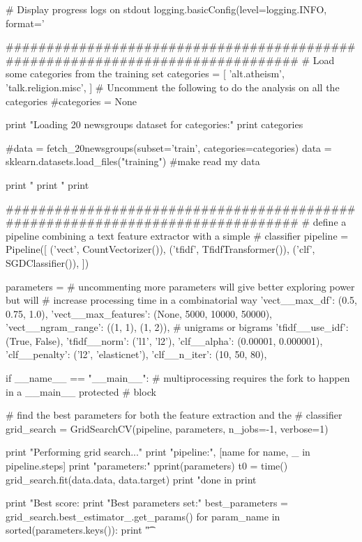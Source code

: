 \begin{pyverbatim}
# Display progress logs on stdout
logging.basicConfig(level=logging.INFO,
                    format='%


###############################################################################
# Load some categories from the training set
categories = [
    'alt.atheism',
    'talk.religion.misc',
]
# Uncomment the following to do the analysis on all the categories
#categories = None

print "Loading 20 newsgroups dataset for categories:"
print categories

#data = fetch_20newsgroups(subset='train', categories=categories)
data = sklearn.datasets.load_files("training") #make read my data

print "%
print "%
print

###############################################################################
# define a pipeline combining a text feature extractor with a simple
# classifier
pipeline = Pipeline([
    ('vect', CountVectorizer()),
    ('tfidf', TfidfTransformer()),
    ('clf', SGDClassifier()),
])

parameters = {
    # uncommenting more parameters will give better exploring power but will
    # increase processing time in a combinatorial way
    'vect__max_df': (0.5, 0.75, 1.0),
    'vect__max_features': (None, 5000, 10000, 50000),
    'vect__ngram_range': ((1, 1), (1, 2)),  # unigrams or bigrams
    'tfidf__use_idf': (True, False),
    'tfidf__norm': ('l1', 'l2'),
    'clf__alpha': (0.00001, 0.000001),
    'clf__penalty': ('l2', 'elasticnet'),
    'clf__n_iter': (10, 50, 80),
}

if __name__ == "__main__":
    # multiprocessing requires the fork to happen in a __main__ protected
    # block

    # find the best parameters for both the feature extraction and the
    # classifier
    grid_search = GridSearchCV(pipeline, parameters, n_jobs=-1, verbose=1)

    print "Performing grid search..."
    print "pipeline:", [name for name, _ in pipeline.steps]
    print "parameters:"
    pprint(parameters)
    t0 = time()
    grid_search.fit(data.data, data.target)
    print "done in %
    print

    print "Best score: %
    print "Best parameters set:"
    best_parameters = grid_search.best_estimator_.get_params()
    for param_name in sorted(parameters.keys()):
        print "\t%

\end{pyverbatim}

